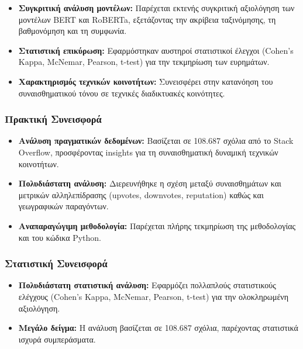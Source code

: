 \documentclass[a4paper,11pt,oneside,openany]{ioniothesis}
\begin{document}
\begin{itemize}
    \item \textbf{Συγκριτική ανάλυση μοντέλων:} Παρέχεται εκτενής συγκριτική αξιολόγηση των μοντέλων BERT και RoBERTa, εξετάζοντας την ακρίβεια ταξινόμησης, τη βαθμονόμηση και τη συμφωνία.
    
    \item \textbf{Στατιστική επικύρωση:} Εφαρμόστηκαν αυστηροί στατιστικοί έλεγχοι (Cohen's Kappa, McNemar, Pearson, t-test) για την τεκμηρίωση των ευρημάτων.
    
    \item \textbf{Χαρακτηρισμός τεχνικών κοινοτήτων:} Συνεισφέρει στην κατανόηση του συναισθηματικού τόνου σε τεχνικές διαδικτυακές κοινότητες.
\end{itemize}

\subsubsection{Πρακτική Συνεισφορά}

\begin{itemize}
    \item \textbf{Ανάλυση πραγματικών δεδομένων:} Βασίζεται σε 108.687 σχόλια από το Stack Overflow, προσφέροντας insights για τη συναισθηματική δυναμική τεχνικών κοινοτήτων.
    
    \item \textbf{Πολυδιάστατη ανάλυση:} Διερευνήθηκε η σχέση μεταξύ συναισθημάτων και μετρικών αλληλεπίδρασης (upvotes, downvotes, reputation) καθώς και γεωγραφικών παραγόντων.
    
    \item \textbf{Αναπαραγώγιμη μεθοδολογία:} Παρέχεται πλήρης τεκμηρίωση της μεθοδολογίας και του κώδικα Python.
\end{itemize}

\subsubsection{Στατιστική Συνεισφορά}

\begin{itemize}
    \item \textbf{Πολυδιάστατη στατιστική ανάλυση:} Εφαρμόζει πολλαπλούς στατιστικούς ελέγχους (Cohen's Kappa, McNemar, Pearson, t-test) για την ολοκληρωμένη αξιολόγηση.
    
    \item \textbf{Μεγάλο δείγμα:} Η ανάλυση βασίζεται σε 108.687 σχόλια, παρέχοντας στατιστικά ισχυρά συμπεράσματα.
\end{itemize}
\end{document}

